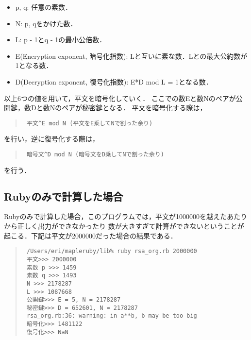\begin{itemize}
\item p, q: 任意の素数．
\item N: p, qをかけた数．
\item L: p - 1とq - 1の最小公倍数．
\item E(Encryption exponent, 暗号化指数): Lと互いに素な数．Lとの最大公約数が1となる数．
\item D(Decryption exponent, 復号化指数): E*D mod L = 1となる数．
\end{itemize}
以上6つの値を用いて，平文を暗号化していく．
ここでの数Eと数Nのペアが公開鍵，数Dと数Nのペアが秘密鍵となる．
平文を暗号化する際は，
\begin{quote}\begin{verbatim}
 平文^E mod N (平文をE乗してNで割った余り)
\end{verbatim}\end{quote}
を行い，逆に復号化する際は，
\begin{quote}\begin{verbatim}
 暗号文^D mod N (暗号文をD乗してNで割った余り)
\end{verbatim}\end{quote}
を行う．

\subsection{Rubyのみで計算した場合}
Rubyのみで計算した場合，このプログラムでは，平文が1000000を越えたあたりから正しく出力ができなかったり
数が大きすぎて計算ができないということが起こる．下記は平文が2000000だった場合の結果である．
\begin{quote}\begin{verbatim}
 /Users/eri/mapleruby/lib% ruby rsa_org.rb 2000000
 平文>>> 2000000
 素数 p >>> 1459
 素数 q >>> 1493
 N >>> 2178287
 L >>> 1087668
 公開鍵>>> E = 5, N = 2178287
 秘密鍵>>> D = 652601, N = 2178287
 rsa_org.rb:36: warning: in a**b, b may be too big
 暗号化>>> 1481122
 復号化>>> NaN
\end{verbatim}\end{quote}
